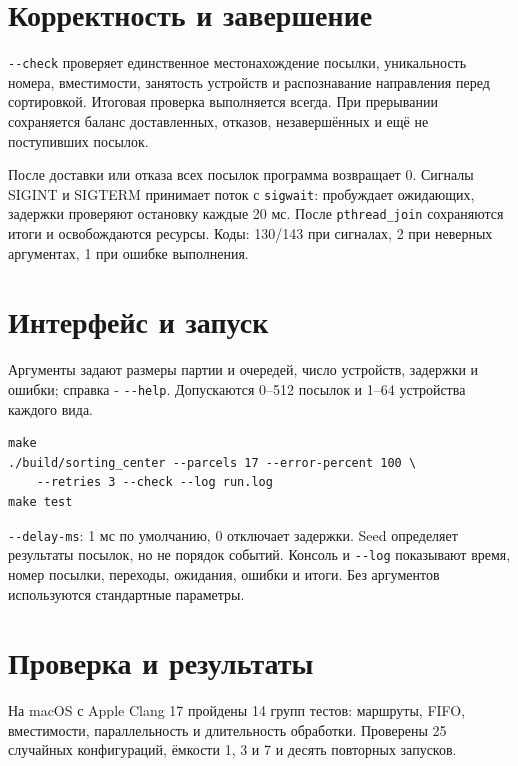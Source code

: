 \section{Корректность и завершение}
\texttt{-{}-check} проверяет единственное местонахождение посылки, уникальность номера, вместимости, занятость устройств и распознавание направления перед сортировкой. Итоговая проверка выполняется всегда. При прерывании сохраняется баланс доставленных, отказов, незавершённых и ещё не поступивших посылок.

После доставки или отказа всех посылок программа возвращает 0. Сигналы SIGINT и SIGTERM принимает поток с \texttt{sigwait}: пробуждает ожидающих, задержки проверяют остановку каждые 20 мс. После \texttt{pthread\_join} сохраняются итоги и освобождаются ресурсы. Коды: 130/143 при сигналах, 2 при неверных аргументах, 1 при ошибке выполнения.

\clearpage
\section{Интерфейс и запуск}
Аргументы задают размеры партии и очередей, число устройств, задержки и ошибки; справка - \texttt{-{}-help}. Допускаются 0--512 посылок и 1--64 устройства каждого вида.
\begin{lstlisting}[frame=none,backgroundcolor=\color{example_back},aboveskip=0pt,belowskip=0pt,xleftmargin=0pt,xrightmargin=0pt]
make
./build/sorting_center --parcels 17 --error-percent 100 \
    --retries 3 --check --log run.log
make test
\end{lstlisting}
\texttt{-{}-delay-ms}: 1 мс по умолчанию, 0 отключает задержки. Seed определяет результаты посылок, но не порядок событий. Консоль и \texttt{-{}-log} показывают время, номер посылки, переходы, ожидания, ошибки и итоги. Без аргументов используются стандартные параметры.

\section{Проверка и результаты}
На macOS с Apple Clang 17 пройдены 14 групп тестов: маршруты, FIFO, вместимости, параллельность и длительность обработки. Проверены 25 случайных конфигураций, ёмкости 1, 3 и 7 и десять повторных запусков.

